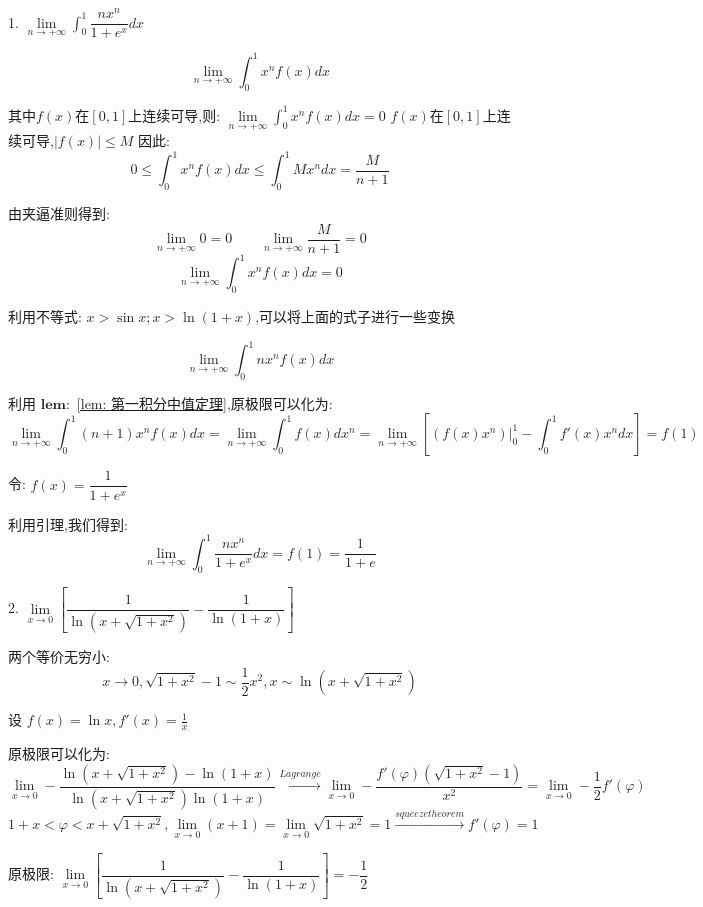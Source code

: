 1. $\lim\limits_{n\rightarrow +\infty}\int_{0}^{1}\dfrac{nx^n}{1+e^x}dx$
\begin{lemma}[第一积分中值定理]\label{lem: 第一积分中值定理}
	
	$$\lim\limits_{n\rightarrow +\infty}\int_{0}^{1}x^nf(x)dx$$
	
	其中$f(x)$在$[0,1]$上连续可导,则: $\lim\limits_{n\rightarrow +\infty}\int_{0}^{1}x^nf(x)dx=0$
	$f(x)$在$[0,1]$上连续可导,$|f(x)|\leq M$
	因此: 
	$$0\leq\int_{0}^{1}x^nf(x)dx\leq\int_{0}^{1}Mx^ndx=\frac{M}{n+1}$$
	
	由夹逼准则得到: 
	$$\lim\limits_{n\rightarrow +\infty}0=0\quad\quad \lim\limits_{n\rightarrow +\infty}\frac{M}{n+1}=0$$
	$$\lim\limits_{n\rightarrow +\infty}\int_{0}^{1}x^nf(x)dx=0$$
	
	利用不等式: $x>\sin x;x>\ln(1+x)$,可以将上面的式子进行一些变换
	
\end{lemma}
\begin{lemma}
	
	$$\lim\limits_{n\rightarrow +\infty}\int_{0}^{1}nx^nf(x)dx$$
	
	利用 $\mathbf{lem: }$ \ref{lem: 第一积分中值定理},原极限可以化为: 
	$$\lim\limits_{n\rightarrow +\infty}\int_{0}^{1}(n+1)x^nf(x)dx=\lim\limits_{n\rightarrow +\infty}\int_{0}^{1}f(x)dx^n=\lim\limits_{n\rightarrow+\infty}[(f(x)x^n)|_{0}^{1}-\int_{0}^{1}f'(x)x^ndx]=f(1)$$
\end{lemma}
\begin{solution}
	
	令: $f(x)=\dfrac{1}{1+e^x}$
	
	利用引理,我们得到: $$\lim\limits_{n\rightarrow +\infty}\int_{0}^{1}\dfrac{nx^n}{1+e^x}dx=f(1)=\dfrac{1}{1+e}$$
\end{solution}

2. $\lim\limits_{x\rightarrow 0}\left[ \dfrac{1}{\ln(x+\sqrt{1+x^2})}-\dfrac{1}{\ln(1+x)}\right] $
\begin{solution}
	
	两个等价无穷小:  $$x\rightarrow 0,\sqrt{1+x^{2}}-1\sim \dfrac{1}{2}x^{2}, x\sim \ln(x+\sqrt{1+x^2})$$
	
	设 $f(x)=\ln x,f'(x)=\frac{1}{x}$
	
	原极限可以化为: 
	$$\lim\limits_{x\rightarrow 0}-\frac{\ln(x+\sqrt{1+x^2})-\ln(1+x)}{\ln(x+\sqrt{1+x^2})\ln(1+x)}\stackrel{Lagrange}{\longrightarrow}\lim\limits_{x\rightarrow 0}-\frac{f'(\varphi)(\sqrt{1+x^2}-1)}{x^2}=\lim\limits_{x\rightarrow 0}-\frac{1}{2}f'(\varphi)$$
	$$1+x<\varphi<x+\sqrt{1+x^2},\lim\limits_{x\rightarrow 0}(x+1)=\lim\limits_{x\rightarrow 0}\sqrt{1+x^2}=1\stackrel{squeeze theorem}{\longrightarrow} f'(\varphi)=1$$
	
	原极限: $\lim\limits_{x\rightarrow 0}\left[ \dfrac{1}{\ln(x+\sqrt{1+x^2})}-\dfrac{1}{\ln(1+x)}\right] =-\dfrac{1}{2}$
	
\end{solution}

